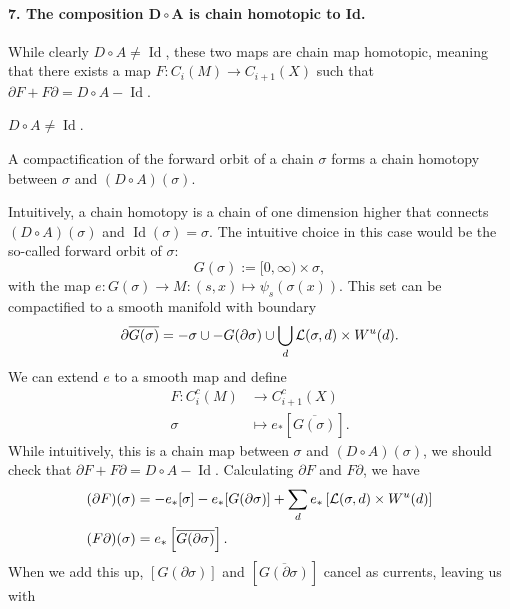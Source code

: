 \begin{myproof}
\paragraph{7. The composition $\bm{D  \circ A}$ is chain homotopic to Id.}
While clearly $D  \circ  A \neq \operatorname{Id}$, these two maps are chain map homotopic, meaning that there exists a map $F: C_i(M) \to  C_{i+1}(X)$ such that $\partial F + F \partial = D  \circ  A - \operatorname{Id}$.
\begin{marginfigure}
    \centering
    \caption{$D  \circ  A \neq  \operatorname{Id}$.}
    \label{fig:d-na-a-is-not-identity}
\end{marginfigure}
\begin{marginfigure}
    \centering
    \caption{A compactification of the forward orbit of a chain $\sigma$ forms a chain homotopy between $\sigma$ and  $(D  \circ  A)(\sigma)$.}
    \label{fig:chain-homotopy-between-d-na-a-and-id}
\end{marginfigure}
Intuitively, a chain homotopy is a chain of one dimension higher that connects $(D  \circ  A)(\sigma)$ and $\operatorname{Id} (\sigma) = \sigma$.
The intuitive choice in this case would be the so-called forward orbit of $\sigma$:
\[
    G(\sigma) := [0, \infty) \times \sigma
,\] with the map $e: G(\sigma) \to  M: (s, x) \mapsto \psi_s (\sigma(x))$.
This set can be compactified to a smooth manifold with boundary
\[
    \partial \overline{G(\sigma)} = - \sigma \cup - G(\partial \sigma) \cup \bigcup_{d}  \mathcal L(\sigma, d) \times W^u(d)
.\] 
We can extend $e$ to a smooth map and define 
\begin{align*}
    F: C_i^{c}(M) &\longrightarrow C_{i+1}^{c}(X) \\
    \sigma &\longmapsto e_* \left[ \overline{G(\sigma)} \right] 
.\end{align*}
While intuitively, this is a chain map between $\sigma$ and  $(D  \circ A)(\sigma)$, we should check that $\partial F + F \partial = D  \circ  A - \operatorname{Id}$.
Calculating $\partial F$ and  $F \partial$, we have
\begin{align*}
    (\partial F)(\sigma) &= -e_*[\sigma] - e_*[G(\partial \sigma)] + \sum_{d} e_*\left[\mathcal L(\sigma, d) \times W^u(d)\right]\\
    (F \partial)(\sigma) &= e_*\left[\overline{G(\partial \sigma)}\right]
    .\end{align*}
    When we add this up, $[G (\partial \sigma)]$ and $\left[ \overline{G(\partial \sigma)} \right]$ cancel as currents, leaving us with


\end{myproof}
